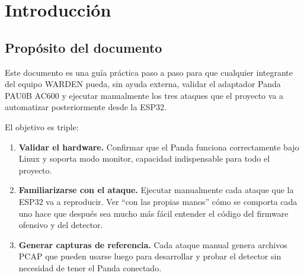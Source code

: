 \documentclass[11pt,a4paper]{article}
\begin{document}

\begin{wardenrevisions}
\end{wardenrevisions}

\tableofcontents
\newpage

\section{Introducción}

\subsection{Propósito del documento}
Este documento es una guía práctica paso a paso para que cualquier integrante
del equipo WARDEN pueda, sin ayuda externa, validar el adaptador Panda
PAU0B AC600 y ejecutar manualmente los tres ataques que el proyecto va a
automatizar posteriormente desde la ESP32.

El objetivo es triple:

\begin{enumerate}
  \item \textbf{Validar el hardware.} Confirmar que el Panda funciona
    correctamente bajo Linux y soporta modo monitor, capacidad
    indispensable para todo el proyecto.
  \item \textbf{Familiarizarse con el ataque.} Ejecutar manualmente cada
    ataque que la ESP32 va a reproducir. Ver ``con las propias manos'' cómo
    se comporta cada uno hace que después sea mucho más fácil entender el
    código del firmware ofensivo y del detector.
  \item \textbf{Generar capturas de referencia.} Cada ataque manual genera
    archivos PCAP que pueden usarse luego para desarrollar y probar el
    detector sin necesidad de tener el Panda conectado.
\end{enumerate}
\end{document}
